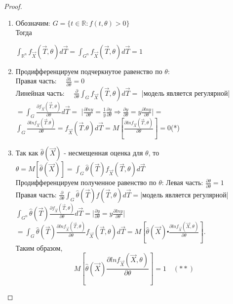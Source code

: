 \documentclass[a4paper, 12pt]{article}
\theoremstyle{definition}
\theoremstyle{leads}
\theoremstyle{example}
\begin{document}
\begin{proof}
	\begin{enumerate}
		\item Обозначим: $G = \{t \in \mathbb{R} : f(t, \theta) > 0\}$\\
		Тогда 
		\begin{center}
			\centering
			$\int_{\mathbb{R}^n}^{} f_{\vec{X}}(\vec{T}, \theta) d\vec{T} = \int_{G^n}{} f_{\vec{X}} (\vec{T}, \theta) d \vec{T} = 1$
		\end{center}
	\item Продифференцируем подчеркнутое равенство по $\theta$:\\
	Правая часть: $\quad \frac{\partial1}{\partial \theta} = 0$\\
	Линейная часть: $\quad \frac{\partial}{\partial \theta} \int_{G}{} f_{\vec{X}} (\vec{T}, \theta) d \vec{T} = $ |модель является регулярной| $ = \int_{G}{} \frac{\partial f_{\vec{X}}(\vec{T}, \theta)}{\partial \theta} d \vec{T} = $ |$\frac{\partial ln y}{\partial \theta} = \frac{1}{y} \frac{\partial y}{\partial \theta} \Longrightarrow \frac{\partial y}{\partial \theta} = y \frac{\partial ln y}{\partial \theta}$| = $\int_{G}{}\frac{\partial ln f_{ \vec{X}}(\vec{T}. \theta)}{\partial \theta} = f_{\vec{X}}(\vec{T}. \theta) d \vec{T} = M [\frac{\partial ln f_{\vec{X}}(\vec{T}, \theta)}{\partial \theta}] = 0$(*)
	\item Так как $ \hat{\theta}(\vec{X})$ - несмещенная оценка для $\theta$, то $\theta = M [ \hat{\theta}(\vec{X})] = \int_{G}{} \hat{\theta}(\vec{T}) f_{\vec{X}}( \vec{T}, \theta) d \vec{T}$\\
	Продифференцируем полученное равенство по $\theta$:
	Левая часть: $\frac{\partial \theta}{\partial \theta} = 1$\\
	Правая часть: $\frac{\partial}{\partial \theta} \int_{G}^{} \hat{\theta}( \vec{T}) f(\vec{T}, \theta) d\vec{T} = $|модель является регулярной|$ \int_{G^n}{} \hat{\theta} (\vec{T}) \frac{\partial f_{\vec{X}}(\vec{T}, \theta)}{\partial \theta} d \vec{T} = $|$\frac{\partial y}{\partial \theta} = y \frac{\partial ln y}{\partial \theta}$|$ = \int_{G}{} \hat{\theta} (\vec{T}) \frac{\partial ln f_{\vec{X}}(\vec{T}, \theta)}{\partial \theta} f_{\vec{X}}(\vec{T}, \theta) d \vec{T} = M [\hat{\theta}(\vec{X}) \centerdot\frac{\partial ln f_{\vec{X}}(\vec{X}, \theta)}{\partial \theta}]$.\\
	Таким образом, 
	\begin{displaymath}
	M[\hat{\theta}(\vec{X}) \frac{\partial ln f_{\vec{X}}(\vec{X}, \theta)}{\partial \theta}] = 1 \quad (**)

\end{displaymath}
\end{enumerate}
\end{proof}
\end{document}
